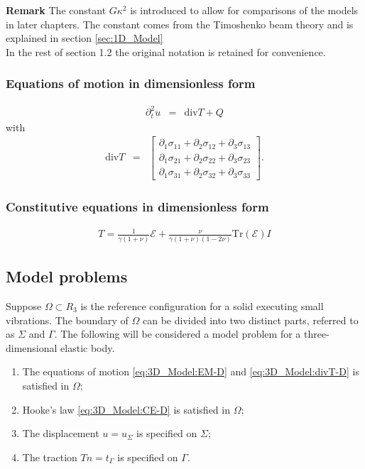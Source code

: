 \documentclass[../../main.tex]{subfiles}
\begin{document}
\textbf{Remark} The constant $G\kappa^2$ is introduced to allow for comparisons of the models in later chapters. The constant comes from the Timoshenko beam theory and is explained in section \ref{sec:1D_Model} \\

In the rest of section 1.2 the original notation is retained for convenience.

\subsubsection*{Equations of motion in dimensionless form}\label{sssec:3D_Model:EquationOfMotionDimensionless}
\begin{eqnarray}
	\partial_t^2 u & = & \textrm{div}T + Q \label{eq:3D_Model:EM-D}
\end{eqnarray}
with
\begin{eqnarray}
	\textrm{div}  T & = &
	\begin{bmatrix}
		\partial_1 \sigma_{11} + \partial_2 \sigma_{12} + \partial_3 \sigma_{13}\\
		\partial_1 \sigma_{21} + \partial_2 \sigma_{22} + \partial_3 \sigma_{23}\\
		\partial_1 \sigma_{31} + \partial_2 \sigma_{32} + \partial_3 \sigma_{33}
	\end{bmatrix}.\label{eq:3D_Model:divT-D}
\end{eqnarray} 

\subsubsection*{Constitutive equations in dimensionless form}\label{sssec:3D_Model:ConstitutiveEquationsDimensionless}
\begin{eqnarray}
	T = \frac{1}{\gamma(1+\nu)} \mathcal{E} + \frac{\nu}{\gamma(1+\nu)(1-2\nu)}\textrm{Tr}(\mathcal{E})I \label{eq:3D_Model:CE-D}
\end{eqnarray}


\subsection{Model problems}\label{ssec:3D_Model:ModelProblems}
Suppose $\Omega \subset R_3$ is the reference configuration for a solid executing small vibrations. The boundary of $\Omega$ can be divided into two distinct parts, referred to as $\Sigma$ and $\Gamma$. The following will be considered a model problem for a three-dimensional elastic body.
\begin{enumerate}
	\item[] The equations of motion \eqref{eq:3D_Model:EM-D} and \eqref{eq:3D_Model:divT-D} is satisfied in $\Omega$;
	\item[] Hooke's law \eqref{eq:3D_Model:CE-D} is satisfied in $\Omega$;
	\item[] The displacement $u = u_\Sigma$ is specified on
	$\Sigma$;
	\item[] The traction $Tn = t_\Gamma$ is specified on
	$\Gamma$.
\end{enumerate}
\end{document}
